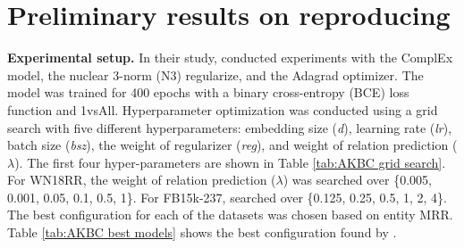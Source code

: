 
\section{Preliminary results on reproducing}

\noindent\textbf{Experimental setup.} In their study, \citet{chen2021relation} conducted experiments with the ComplEx model, the nuclear 3-norm (N3) regularize, and the Adagrad optimizer. The model was trained for 400 epochs with a binary cross-entropy (BCE) loss function and 1vsAll. Hyperparameter optimization was conducted using a grid search with five different hyperparameters: embedding size (\textit{d}), learning rate (\textit{lr}), batch size (\textit{bsz}), the weight of regularizer (\textit{reg}), and weight of relation prediction ($\lambda$). The first four hyper-parameters are shown in Table \ref{tab:AKBC grid search}. For WN18RR, the weight of relation prediction ($\lambda$) was searched over \{0.005, 0.001, 0.05, 0.1, 0.5, 1\}. For FB15k-237, \citet{chen2021relation} searched over \{0.125, 0.25, 0.5, 1, 2, 4\}. The best configuration for each of the datasets was chosen based on entity MRR. Table \ref{tab:AKBC best models} shows the best configuration found by \citet{chen2021relation}.

\begin{table}[!htbp]
\centering
{}
\caption[Hyperparameter values from Chen et. al. paper]{Hyperparameter values used by \citet{chen2021relation} to find best models}
\label{tab:AKBC grid search}
\end{table}


